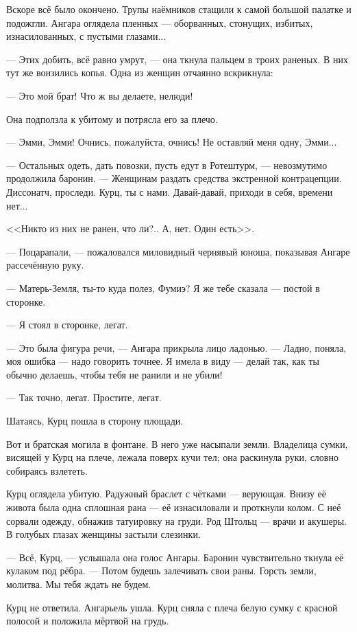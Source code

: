 Вскоре всё было окончено.
Трупы наёмников стащили к самой большой палатке и подожгли.
Ангара оглядела пленных --- оборванных, стонущих, избитых, изнасилованных, с пустыми глазами...

--- Этих добить, всё равно умрут, --- она ткнула пальцем в троих раненых.
В них тут же вонзились копья.
Одна из женщин отчаянно вскрикнула:

--- Это мой брат!
Что ж вы делаете, нелюди!

Она подползла к убитому и потрясла его за плечо.

--- Эмми, Эмми!
Очнись, пожалуйста, очнись!
Не оставляй меня одну, Эмми...

--- Остальных одеть, дать повозки, пусть едут в Ротештурм, --- невозмутимо продолжила баронин.
--- Женщинам раздать средства экстренной контрацепции.
Диссонатч, проследи.
Курц, ты с нами.
Давай-давай, приходи в себя, времени нет...

<<Никто из них не ранен, что ли?..
А, нет.
Один есть>>.

--- Поцарапали, --- пожаловался миловидный чернявый юноша, показывая Ангаре рассечённую руку.

--- Матерь-Земля, ты-то куда полез, Фумиэ?
Я же тебе сказала --- постой в сторонке.

--- Я стоял в сторонке, легат.

--- Это была фигура речи, --- Ангара прикрыла лицо ладонью.
--- Ладно, поняла, моя ошибка --- надо говорить точнее.
Я имела в виду --- делай так, как ты обычно делаешь, чтобы тебя не ранили и не убили!

--- Так точно, легат.
Простите, легат.

Шатаясь, Курц пошла в сторону площади.

Вот и братская могила в фонтане.
В него уже насыпали земли.
Владелица сумки, висящей у Курц на плече, лежала поверх кучи тел;
она раскинула руки, словно собираясь взлететь.

Курц оглядела убитую.
Радужный браслет с чётками --- верующая.
Внизу её живота была одна сплошная рана --- её изнасиловали и проткнули колом.
С неё сорвали одежду, обнажив татуировку на груди.
Род Штольц --- врачи и акушеры.
В голубых глазах женщины застыли слезинки.

--- Всё, Курц, --- услышала она голос Ангары.
Баронин чувствительно ткнула её кулаком под рёбра.
--- Потом будешь залечивать свои раны.
Горсть земли, молитва.
Мы тебя ждать не будем.

Курц не ответила.
Ангарьель ушла.
Курц сняла с плеча белую сумку с красной полосой и положила мёртвой на грудь.

